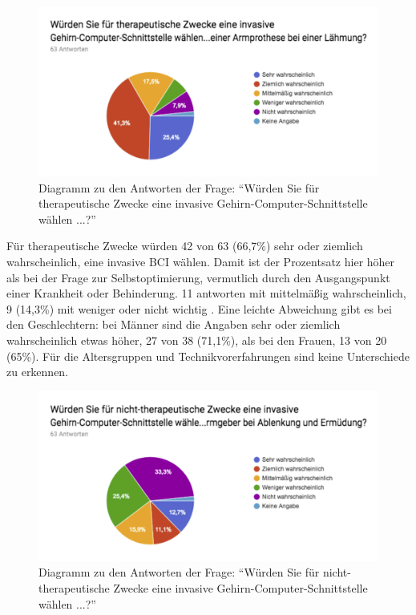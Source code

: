 \documentclass[11pt,ngerman,parskip=half]{scrartcl}
\begin{document}
\begin{figure}[H]
  \centering
  \includegraphics[width=1.0\textwidth]{src/img/kathrin2.png}
  \caption{Diagramm zu den Antworten der Frage: \enquote{Würden Sie für
  therapeutische Zwecke eine invasive Gehirn-Computer-Schnittstelle wählen
  ...?}}
  \label{img:kathrin2}
\end{figure}

Für therapeutische Zwecke würden 42 von 63 (66,7\%) sehr oder ziemlich
wahrscheinlich, eine invasive BCI wählen. Damit ist der Prozentsatz hier
höher als bei der Frage zur Selbstoptimierung, vermutlich durch den
Ausgangspunkt einer Krankheit oder Behinderung. 11 antworten mit mittelmäßig
wahrscheinlich, 9 (14,3\%) mit weniger oder nicht wichtig . Eine leichte
Abweichung gibt es bei den Geschlechtern: bei Männer sind die Angaben sehr
oder ziemlich wahrscheinlich etwas höher, 27 von 38 (71,1\%), als bei den
Frauen, 13 von 20 (65\%). Für die Altersgruppen und Technikvorerfahrungen sind
keine Unterschiede zu erkennen.

\begin{figure}[H]
  \centering
  \includegraphics[width=1.0\textwidth]{src/img/kathrin3.png}
  \caption{Diagramm zu den Antworten der Frage: \enquote{Würden Sie für
  nicht-therapeutische Zwecke eine invasive Gehirn-Computer-Schnittstelle
  wählen ...?}}
  \label{img:kathrin3}
\end{figure}
\end{document}
